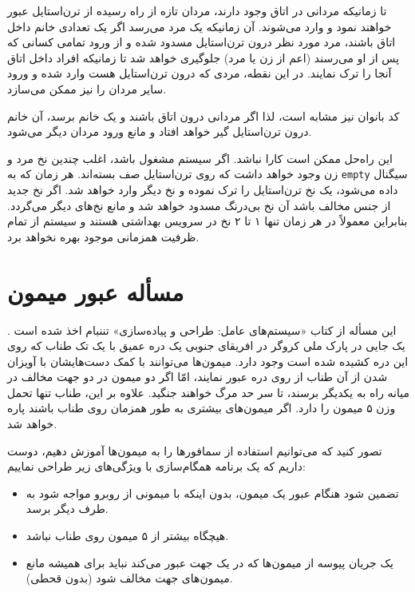 \documentclass{book}
\begin{document}
    تا زمانیکه مردانی در اتاق وجود دارند، مردان تازه از راه رسیده از ترن‌استایل عبور خواهند نمود و وارد می‌شوند. آن زمانیکه یک مرد  می‌رسد اگر یک تعدادی خانم 
    داخل اتاق باشند، مرد مورد نظر درون ترن‌استایل مسدود شده و از ورود تمامی کسانی که پس از او می‌رسند (اعم از زن یا مرد) جلوگیری خواهد شد تا زمانیکه
    افراد داخل اتاق آنجا را ترک نمایند. در این نقطه، مردی که درون ترن‌استایل هست وارد شده و ورود سایر مردان را نیز ممکن می‌سازد. 

    کد بانوان نیز مشابه است، لذا اگر مردانی درون اتاق باشند و یک خانم برسد، آن خانم درون ترن‌استایل گیر خواهد افتاد و مانع ورود مردان دیگر می‌شود. 

    این راه‌حل ممکن است کارا نباشد. اگر سیستم مشغول باشد، اغلب چندین نخ مرد و زن وجود خواهد داشت که روی ترن‌استایل صف بسته‌اند. 
    هر زمان که به {\tt empty} سیگنال داده می‌شود، یک نخ ترن‌استایل را ترک نموده و نخ دیگر وارد خواهد شد. اگر نخ جدید از جنس مخالف باشد 
    آن نخ بی‌درنگ مسدود خواهد شد و مانع نخ‌های دیگر می‌گردد. بنابراین معمولاً  در هر زمان تنها ۱ تا ۲ نخ در سرویس بهداشتی هستند و سیستم از تمام 
    ظرفیت همزمانی موجود بهره نخواهد برد. 


\section{مسأله عبور میمون}

    این مسأله از کتاب «سیستم‌های عامل: طراحی و پیاده‌سازی» تننبام اخذ شده است \cite{tanenbaum}.
    یک جایی در پارک ملی کروگر در افریقای جنوبی
    یک دره عمیق با یک تک طناب که روی این دره کشیده شده است وجود دارد. میمون‌ها می‌توانند با کمک دست‌هایشان با آویزان شدن از آن طناب 
    از روی دره عبور نمایند، امّا اگر دو میمون در دو جهت مخالف در میانه راه به یکدیگر برسند، تا سر حد مرگ خواهند جنگید. 
    علاوه بر این،‌ طناب تنها تحمل وزن ۵ میمون را دارد. اگر میمون‌های بیشتری به طور همزمان روی طناب باشند پاره خواهد شد. 

    تصور کنید که می‌توانیم  استفاده از سمافورها را به میمون‌ها آموزش دهیم، دوست داریم که یک برنامه همگام‌سازی با ویژگی‌های زیر طراحی نماییم:

\begin{itemize}

\item 
     تضمین شود هنگام عبور یک میمون، بدون اینکه با میمونی از روبرو مواجه شود به طرف دیگر برسد. 

\item
    هیچگاه بیشتر از ۵ میمون روی طناب نباشد. 

\item
    یک جریان پیوسه از میمون‌ها که در یک جهت عبور می‌کند نباید برای همیشه مانع میمون‌های جهت مخالف شود (بدون قحطی). 

\end{itemize}
\end{document}
